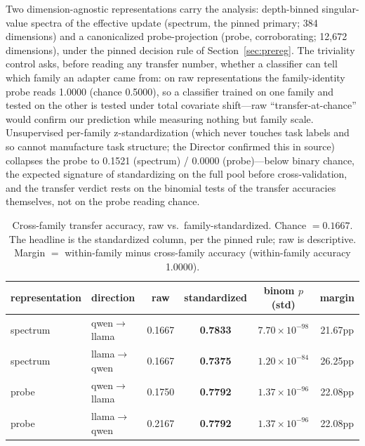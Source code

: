 \documentclass[10pt]{article}
\begin{document}
Two dimension-agnostic representations carry the analysis: depth-binned
singular-value spectra of the effective update (spectrum, the pinned
primary; 384 dimensions) and a canonicalized probe-projection (probe,
corroborating; 12{,}672 dimensions), under the pinned decision rule of
Section~\ref{sec:prereg}. The triviality control asks, before reading any
transfer number, whether a classifier can tell which family an adapter
came from: on raw representations the family-identity probe reads 1.0000
(chance 0.5000), so a classifier trained on one family and tested on the
other is tested under total covariate shift---raw ``transfer-at-chance''
would confirm our prediction while measuring nothing but family scale.
Unsupervised per-family z-standardization (which never touches task labels
and so cannot manufacture task structure; the Director confirmed this in
source) collapses the probe to 0.1521 (spectrum) / 0.0000 (probe)---below
binary chance, the expected signature of standardizing on the full pool
before cross-validation, and the transfer verdict rests on the binomial
tests of the transfer accuracies themselves, not on the probe reading
chance.

\begin{table}[ht]
\centering
\caption{Cross-family transfer accuracy, raw vs.\ family-standardized.
Chance $= 0.1667$. The headline is the standardized column, per the pinned
rule; raw is descriptive. Margin $=$ within-family minus cross-family
accuracy (within-family accuracy 1.0000).}
\label{tab:transfer}
\small
\begin{tabular}{llcccc}
\toprule
representation & direction & raw & standardized & binom $p$ (std) & margin \\
\midrule
spectrum & qwen$\rightarrow$llama & 0.1667 & \textbf{0.7833} & $7.70\times10^{-98}$ & 21.67pp \\
spectrum & llama$\rightarrow$qwen & 0.1667 & \textbf{0.7375} & $1.20\times10^{-84}$ & 26.25pp \\
probe & qwen$\rightarrow$llama & 0.1750 & \textbf{0.7792} & $1.37\times10^{-96}$ & 22.08pp \\
probe & llama$\rightarrow$qwen & 0.2167 & \textbf{0.7792} & $1.37\times10^{-96}$ & 22.08pp \\
\bottomrule
\end{tabular}
\end{table}
\end{document}

